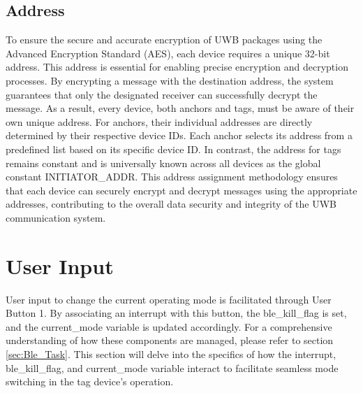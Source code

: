 \subsection{Address}
To ensure the secure and accurate encryption of UWB packages using the Advanced Encryption Standard (AES), each device requires a unique 32-bit address. 
This address is essential for enabling precise encryption and decryption processes. 
By encrypting a message with the destination address, the system guarantees that only the designated receiver can successfully decrypt the message. 
As a result, every device, both anchors and tags, must be aware of their own unique address.
\vspace{4pt}
\newline
For anchors, their individual addresses are directly determined by their respective device IDs. 
Each anchor selects its address from a predefined list based on its specific device ID. 
In contrast, the address for tags remains constant and is universally known across all devices as the global constant INITIATOR\_ADDR. 
This address assignment methodology ensures that each device can securely encrypt and decrypt messages using the appropriate addresses, contributing to the overall data security and integrity of the UWB communication system.

\section{User Input}
User input to change the current operating mode is facilitated through User Button 1. 
By associating an interrupt with this button, the ble\_kill\_flag is set, and the current\_mode variable is updated accordingly. 
For a comprehensive understanding of how these components are managed, please refer to section \ref{sec:Ble_Task}. 
This section will delve into the specifics of how the interrupt, ble\_kill\_flag, and current\_mode variable interact to facilitate seamless mode switching in the tag device's operation. 

